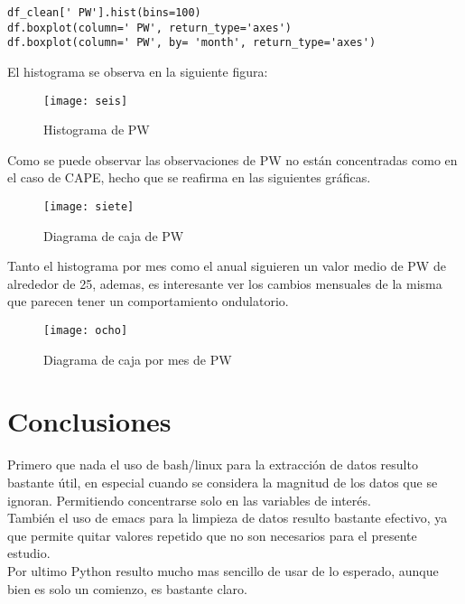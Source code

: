 \documentclass[12pt,letterpaper]{article}
\begin{document}
\begin{verbatim}
df_clean[' PW'].hist(bins=100)
df.boxplot(column=' PW', return_type='axes')
df.boxplot(column=' PW', by= 'month', return_type='axes')
\end{verbatim}

El histograma se observa en la siguiente figura:

\begin{figure}[H]
\begin{center}
\texttt{[image: seis]}
\end{center}
\caption{Histograma de PW}
\end{figure}

Como se puede observar las observaciones de PW no están concentradas como en el caso de CAPE, hecho que se reafirma en las siguientes gráficas.

\begin{figure}[H]
\begin{center}
\texttt{[image: siete]}
\end{center}
\caption{Diagrama de caja de PW}
\end{figure}

Tanto el histograma por mes como el anual siguieren un valor medio de PW de alrededor de 25, ademas, es interesante ver los cambios mensuales de la misma que parecen tener un comportamiento ondulatorio.

\begin{figure}[H]
\begin{center}
\texttt{[image: ocho]}
\end{center}
\caption{Diagrama de caja por mes de PW}
\end{figure}


\section{Conclusiones} 

Primero que nada el uso de bash/linux para la extracción de datos resulto bastante útil, en especial cuando se considera la magnitud de los datos que se ignoran. Permitiendo concentrarse solo en las variables de interés.\\
También el uso de emacs para la limpieza de datos resulto bastante efectivo, ya que permite quitar valores repetido que no son necesarios para el presente estudio.\\
Por ultimo Python resulto mucho mas sencillo de usar de lo esperado, aunque bien es solo un comienzo, es bastante claro.\\
\end{document}
